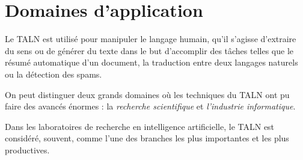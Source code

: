 \section{Domaines d'application}
Le TALN est utilisé pour manipuler le langage humain, qu'il s'agisse d'extraire du sens ou de générer du texte dans le but d'accomplir des tâches telles que le résumé automatique d'un document, la traduction entre deux langages naturels ou la détection des spams.

On peut distinguer deux grands domaines où les techniques du TALN ont pu faire des avancés énormes : la \emph{recherche scientifique} et \emph{l'industrie informatique}.

Dans les laboratoires de recherche en intelligence artificielle, le TALN est considéré, souvent, comme l'une des branches les plus importantes et les plus productives.

